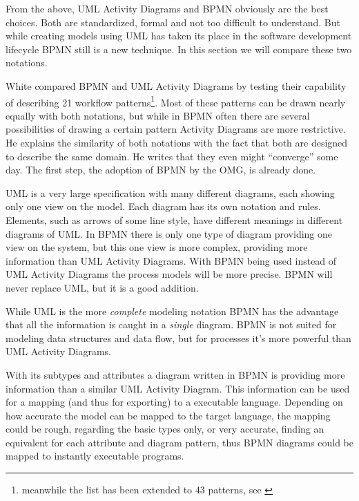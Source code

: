 From the above, UML Activity Diagrams and BPMN obviously are the best choices. Both are standardized, formal and not too difficult to understand. But while creating models using UML has taken its place in the software development lifecycle BPMN still is a new technique. In this section we will compare these two notations.

White \cite{bpmnVsAct} compared BPMN and UML Activity Diagrams by testing their capability of describing 21 workflow patterns\footnote{meanwhile the list has been extended to 43 patterns, see \cite{patterns2}}\cite{patterns1}. Most of these patterns can be drawn nearly equally with both notations, but while in BPMN often there are several possibilities of drawing a certain pattern Activity Diagrams are more restrictive. He explains the similarity of both notations with the fact that both are designed to describe the same domain. He writes that they even might ``converge'' some day. The first step, the adoption of BPMN by the OMG, is already done.

UML is a very large specification with many different diagrams, each showing only one view on the model. Each diagram has its own notation and rules. Elements, such as arrows of some line style, have different meanings in different diagrams of UML. In BPMN there is only one type of diagram providing one view on the system, but this one view is more complex, providing more information than UML Activity Diagrams. With BPMN being used instead of UML Activity Diagrams the process models will be more precise. BPMN will never replace UML, but it is a good addition.

While UML is the more \emph{complete} modeling notation BPMN has the advantage that all the information is caught in a \emph{single} diagram. BPMN is not suited for modeling data structures and data flow, but for processes it's more powerful than UML Activity Diagrams.

With its subtypes and attributes a diagram written in BPMN is providing more information than a similar UML Activity Diagram. This information can be used for a mapping (and thus for exporting) to a executable language. Depending on how accurate the model can be mapped to the target language, the mapping could be rough, regarding the basic types only, or very accurate, finding an equivalent for each attribute and diagram pattern, thus BPMN diagrams could be mapped to instantly executable programs.

